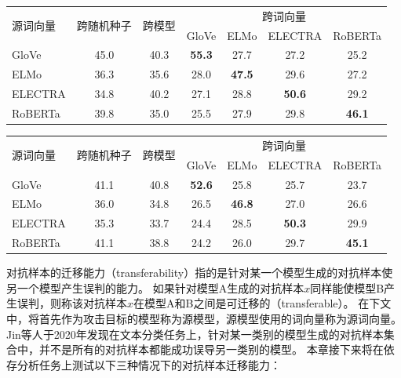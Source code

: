 \begin{table}[h]
    \vspace{0.5em}\centering\wuhao
	\begin{tabular}{lcccccc}
		\toprule[1.5pt]
		\multirow{2}{*}{源词向量}& \multirow{2}{*}{跨随机种子} & \multirow{2}{*}{跨模型} & \multicolumn{4}{c}{跨词向量} \\
		\cline{4-7}
		& &  & GloVe & ELMo & ELECTRA & RoBERTa \\
		\midrule[1pt]
		GloVe &45.0  &40.3  &\bf 55.3 &27.7 &27.2 &25.2 \\
		ELMo &36.3  &35.6  &28.0 &\bf 47.5 &29.6 &27.2 \\
		ELECTRA &34.8  &40.2  &27.1 &28.8 &\bf 50.6 &29.2 \\
		RoBERTa &39.8  &35.0  &25.5 &27.9 &29.8 &\bf 46.1 \\
		\bottomrule[1.5pt]
	\end{tabular}
\end{table}

\begin{table}[h]
    \vspace{0.5em}\centering\wuhao
	\begin{tabular}{lcccccc}
		\toprule[1.5pt]
		\multirow{2}{*}{源词向量}& \multirow{2}{*}{跨随机种子} & \multirow{2}{*}{跨模型} & \multicolumn{4}{c}{跨词向量} \\
		\cline{4-7}
		& &  & GloVe & ELMo & ELECTRA & RoBERTa \\
		\midrule[1pt]
		GloVe &41.1  &40.8  &\bf 52.6 &25.8 &25.7 &23.7 \\
		ELMo &36.0  &34.8  &26.5 &\bf 46.8 &27.0 &26.6 \\
		ELECTRA &35.3  &33.7  &24.4 &28.5 &\bf 50.3 &29.9 \\
		RoBERTa &41.1  &38.8  &24.2 &26.0 &29.7 &\bf 45.1 \\
		\bottomrule[1.5pt]
	\end{tabular}
\end{table}

对抗样本的迁移能力（transferability）指的是针对某一个模型生成的对抗样本使另一个模型产生误判的能力。
如果针对模型A生成的对抗样本$x$同样能使模型B产生误判，则称该对抗样本$x$在模型A和B之间是可迁移的（transferable）。
在下文中，将首先作为攻击目标的模型称为源模型，源模型使用的词向量称为源词向量。
Jin等人\cite{jin-etal-2020-isbert}于2020年发现在文本分类任务上，针对某一类别的模型生成的对抗样本集合中，并不是所有的对抗样本都能成功误导另一类别的模型。
本章接下来将在依存分析任务上测试以下三种情况下的对抗样本迁移能力：

